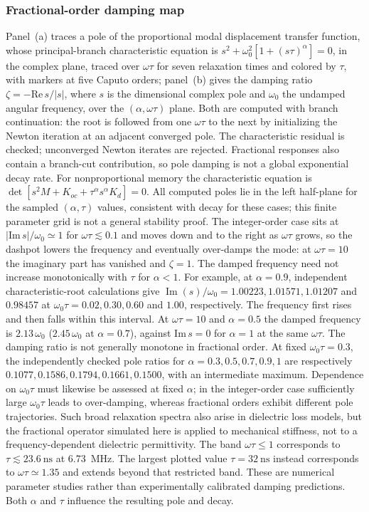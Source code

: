 \subsubsection{Fractional-order damping map}

Panel~(a) traces a pole of the proportional modal displacement transfer
function, whose principal-branch characteristic equation is
$s^2+\omega_0^2[1+(s\tau)^\alpha]=0$, in the complex plane, traced over $\omega\tau$ for seven relaxation times and colored by
$\tau$, with markers at five Caputo orders; panel~(b) gives the
damping ratio $\zeta=-\mathrm{Re}\,s/|s|$, where $s$ is the dimensional
complex pole and $\omega_0$ the undamped angular frequency, over the
$(\alpha,\omega\tau)$ plane. Both are computed with branch continuation: the
root is followed from one $\omega\tau$ to the next by initializing the Newton
iteration at an adjacent converged pole. The characteristic residual is checked;
unconverged Newton iterates are rejected. Fractional responses also contain
a branch-cut contribution, so pole damping is not a global exponential decay rate.
For nonproportional memory the characteristic equation is
$\det[s^2M+K_{oc}+\tau^\alpha s^\alpha K_d]=0$. All computed poles lie in the left half-plane
for the sampled $(\alpha,\tau)$ values, consistent with decay for
these cases; this finite parameter grid is not a general stability proof. The integer-order case sits at
$|\mathrm{Im}\,s|/\omega_0\simeq1$ for $\omega\tau\lesssim0.1$ and moves down
and to the right as $\omega\tau$ grows, so the dashpot lowers the frequency and
eventually over-damps the mode: at $\omega\tau=10$ the imaginary part has
vanished and $\zeta=1$. The damped frequency need not increase monotonically with $\tau$ for
$\alpha<1$. For example, at $\alpha=0.9$, independent characteristic-root
calculations give $\operatorname{Im}(s)/\omega_0=1.00223,1.01571,1.01207$
and $0.98457$ at $\omega_0\tau=0.02,0.30,0.60$ and $1.00$, respectively.
The frequency first rises and then falls within this interval. At
$\omega\tau=10$ and $\alpha=0.5$ the damped frequency is $2.13\,\omega_0$
($2.45\,\omega_0$ at $\alpha=0.7$), against $\mathrm{Im}\,s=0$ for $\alpha=1$ at
the same $\omega\tau$. The damping ratio is not generally monotone in fractional order. At
fixed $\omega_0\tau=0.3$, the independently checked pole ratios for
$\alpha=0.3,0.5,0.7,0.9,1$ are respectively
$0.1077,0.1586,0.1794,0.1661,0.1500$, with an intermediate maximum.
Dependence on $\omega_0\tau$ must likewise be assessed at fixed $\alpha$;
in the integer-order case sufficiently large $\omega_0\tau$ leads to
over-damping, whereas fractional orders exhibit different pole trajectories. Such broad relaxation spectra also arise in dielectric loss models,
but the fractional operator simulated here is applied to mechanical stiffness,
not to a frequency-dependent dielectric permittivity. The band $\omega\tau\le1$ corresponds to
$\tau\lesssim\SI{23.6}{\nano\second}$ at \SI{6.73}{MHz}.
The largest plotted value $\tau=\SI{32}{\nano\second}$ instead
corresponds to $\omega\tau\simeq1.35$ and extends beyond that
restricted band. These are numerical parameter studies rather than
experimentally calibrated damping predictions. Both $\alpha$ and
$\tau$ influence the resulting pole and decay.


